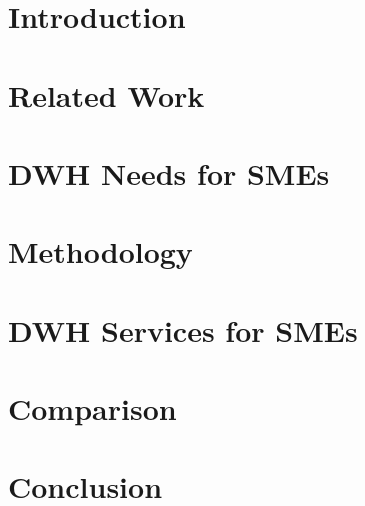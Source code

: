 \documentclass[12pt]{article}
\begin{document}
\maketitle

\newpage



\newpage

\tableofcontents

\newpage

\section{Introduction}
\label{sec:introduction}


\newpage

\section{Related Work}
\label{sec:related-work}


\newpage

\section{DWH Needs for SMEs}
\label{sec:dwh-needs-for-smes}


\newpage

\section{Methodology}
\label{sec:methodology}


\newpage

\section{DWH Services for SMEs}
\label{sec:dwh-services-for-smes}


\newpage

\section{Comparison}
\label{sec:comparison}


\newpage

\section{Conclusion}
\label{sec:conclusion}

\newpage
\printbibliography
\end{document}
